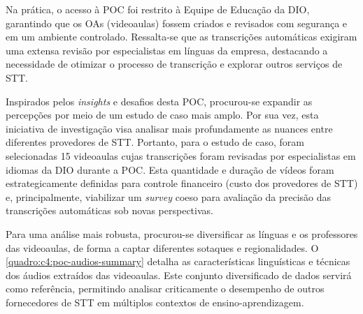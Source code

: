 Na prática, o acesso à POC foi restrito à Equipe de Educação da DIO, garantindo que os OAs (videoaulas) fossem criados e revisados com segurança e em um ambiente controlado. Ressalta-se que as transcrições automáticas exigiram uma extensa revisão por especialistas em línguas da empresa, destacando a necessidade de otimizar o processo de transcrição e explorar outros serviços de STT.

Inspirados pelos \textit{insights} e desafios desta POC, procurou-se expandir as percepções por meio de um estudo de caso mais amplo. Por sua vez, esta iniciativa de investigação visa analisar mais profundamente as nuances entre diferentes provedores de STT. Portanto, para o estudo de caso, foram selecionadas 15 videoaulas cujas transcrições foram revisadas por especialistas em idiomas da DIO durante a POC. Esta quantidade e duração de vídeos foram estrategicamente definidas para controle financeiro (custo dos provedores de STT) e, principalmente, viabilizar um \textit{survey} coeso para avaliação da precisão das transcrições automáticas sob novas perspectivas.

Para uma análise mais robusta, procurou-se diversificar as línguas e os professores das videoaulas, de forma a captar diferentes sotaques e regionalidades. O \autoref{quadro:c4:poc-audios-summary} detalha as características linguísticas e técnicas dos áudios extraídos das videoaulas. Este conjunto diversificado de dados servirá como referência, permitindo analisar criticamente o desempenho de outros fornecedores de STT em múltiplos contextos de ensino-aprendizagem.

